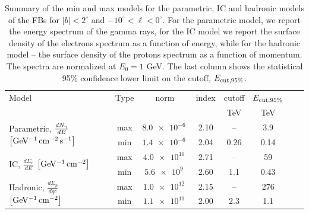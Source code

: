 \begin{table}
  \begin{center}
    \caption{Summary of the min and max models for the parametric, 
    IC and hadronic models of the FBs for $|b| < 2^\circ$ and $-10^\circ < \ell < 0^\circ$. 
    For the parametric model, we report the energy spectrum of the gamma rays,
    for the IC model we report the surface density of the electrons spectrum as a function of energy,
    while for the hadronic model -- the surface density of the protons spectrum as a function of momentum.
    The spectra are normalized at $E_0 = 1$ GeV. The last column shows the statistical 95\% confidence lower limit on the cutoff, $E_{\rm cut, 95\%}$.}
    \label{tab:summary}
    \begin{tabular}{| l |c|c|c|c|c|c|c|} %
     	\hline
		 {\hspace{2cm}Model} & Type  & norm & index & cutoff & $E_{\rm cut, 95\%}$ \\ 
		       &        &   &  & {\rm\small TeV} & {\rm\small TeV}\\ 
		\hline
  		\multirow{2}{*}{Parametric, $\frac{dN_\gamma}{dE}$ {\small $\left[{\rm {GeV^{-1}\, cm^{-2}\, s^{-1} }}\right]$}} & max & $\SI{8.0e-6}{}$  & 2.10 &  -- & 3.9 \\ 
		& min & $\SI{1.4e-6}{}$ & 2.04 &  0.26 & 0.14  \\ 
 		\hline
  		\multirow{2}{*}{IC, $\frac{d\Sigma_e}{dE}$ {\small $\left[{\rm {GeV^{-1}\, cm^{-2}}}\right]$}} & max & $\SI{4.0e10}{}$ & 2.71 &  -- & 59 \\ 
		& min & $\SI{5.6e9}{}$ & 2.60 &  1.1 & 0.43  \\ 
 		\hline
  		\multirow{2}{*}{Hadronic, $\frac{d\Sigma_p}{dqc}$ {\small $\left[{\rm {GeV^{-1}\, cm^{-2}}}\right]$}} & max & $\SI{1.0e12}{}$& 2.15 &  -- & 276 \\ 
		& min & $\SI{1.1e11}{}$ & 2.00 &  2.3 & 1.1  \\ 
 \hline
    \end{tabular}
  \end{center}
\end{table}



